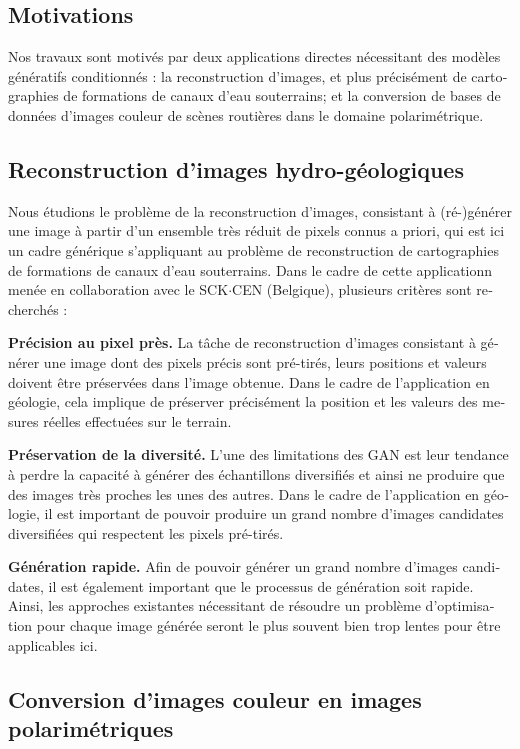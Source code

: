 \begin{otherlanguage}{french}
\section*{Motivations}

\quad Nos travaux sont motivés par deux applications directes nécessitant des modèles génératifs conditionnés : la reconstruction d'images, et plus précisément de cartographies de formations de canaux d'eau souterrains; et la conversion de bases de données d'images couleur de scènes routières dans le domaine polarimétrique. 

\subsection*{Reconstruction d'images hydro-géologiques}

Nous étudions le problème de la reconstruction d'images, consistant à (ré-)générer une image à partir d'un ensemble très réduit de pixels connus a priori, qui est ici un cadre générique s'appliquant au problème de reconstruction de cartographies de formations de canaux d'eau souterrains. Dans le cadre de cette applicationn menée en collaboration avec le SCK$\cdot$CEN (Belgique), plusieurs critères sont recherchés :

\textbf{Précision au pixel près.} La tâche de reconstruction d'images consistant à générer une image dont des pixels précis sont pré-tirés, leurs positions et valeurs doivent être préservées dans l'image obtenue. Dans le cadre de l'application en géologie, cela implique de préserver précisément la position et les valeurs des mesures réelles effectuées sur le terrain.

\textbf{Préservation de la diversité.} L'une des limitations des \ac{GAN} est leur tendance à perdre la capacité à générer des échantillons diversifiés et ainsi ne produire que des images très proches les unes des autres. Dans le cadre de l'application en géologie, il est important de pouvoir produire un grand nombre d'images candidates diversifiées qui respectent les pixels pré-tirés.

\textbf{Génération rapide.} Afin de pouvoir générer un grand nombre d'images  candidates, il est également important que le processus de génération soit rapide. Ainsi, les approches existantes nécessitant de résoudre un problème d'optimisation pour chaque image générée seront le plus souvent bien trop lentes pour être applicables ici.

\subsection*{Conversion d'images couleur en images polarimétriques}


\end{otherlanguage}
